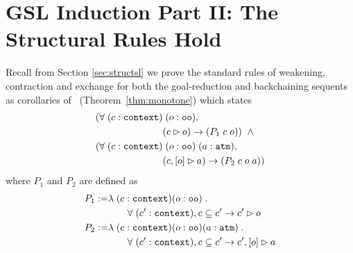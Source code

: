 \section{GSL Induction Part II: The Structural Rules Hold}
\label{sec:structrules}



Recall from Section \ref{sec:structsl} we prove the standard rules of weakening, contraction and exchange for both the goal-reduction and backchaining sequents as corollaries of~ (Theorem~\ref{thm:monotone}) which states
\begin{align*}
(\forall \; (c : \sltm{context}) & \; (o : \sltm{oo}), \\
& (\seqsl[c]{o}) \rightarrow (P_1 \; c \; o)) \;\; \wedge \\
(\forall \; (c : \sltm{context}) & \; (o : \sltm{oo}) \; (a : \sltm{atm}), \\
& (\bchsl[c]{o}{a}) \rightarrow (P_2 \; c \; o \; a))
\end{align*}
where $P_1$ and $P_2$ are defined as
\begin{align*}
P_1 :=& \lambda \; (c : \sltm{context}) (o : \sltm{oo}) \; . \\
& \qquad \forall \; (\inddyncon{} : \sltm{context}), c \subseteq \inddyncon{} \rightarrow \seqsl[\inddyncon{}]{o} \\
P_2 :=& \lambda \; (c : \sltm{context}) (o : \sltm{oo}) (a : \sltm{atm}) \; . \\
& \qquad \forall \; (\inddyncon{} : \sltm{context}), c \subseteq \inddyncon{} \rightarrow \bchsl[\inddyncon{}]{o}{a}
\end{align*}


